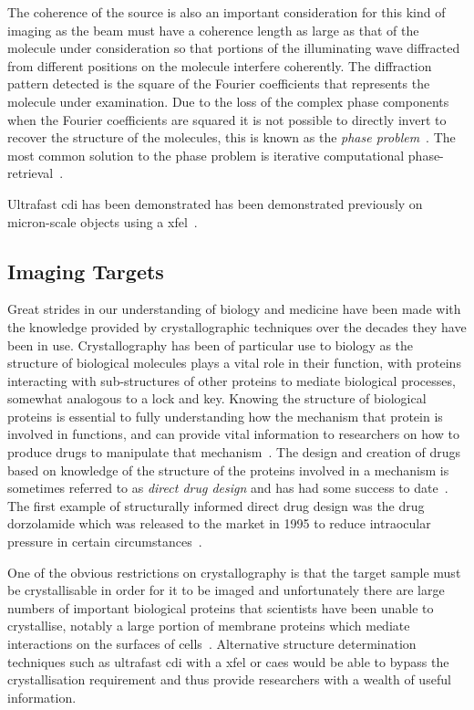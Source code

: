 The coherence of the source is also an important consideration for this kind of imaging as the beam must have a coherence length as large as that of the molecule under consideration so that portions of the illuminating wave diffracted from different positions on the molecule interfere coherently.
The diffraction pattern detected is the square of the Fourier coefficients that represents the molecule under examination.
Due to the loss of the complex phase components when the Fourier coefficients are squared it is not possible to directly invert to recover the structure of the molecules, this is known as the \emph{phase problem}~\cite{rodenburg_phase_1989}.
The most common solution to the phase problem is iterative computational phase-retrieval~\cite{chapman_coherent_2010}.

Ultrafast \gls{cdi} has been demonstrated has been demonstrated previously on micron-scale objects using a \gls{xfel}~\cite{chapman_femtosecond_2006}.

\subsection{Imaging Targets}

Great strides in our understanding of biology and medicine have been made with the knowledge provided by crystallographic techniques over the decades they have been in use.
Crystallography has been of particular use to biology as the structure of biological molecules plays a vital role in their function, with proteins interacting with sub-structures of other proteins to mediate biological processes, somewhat analogous to a lock and key.
Knowing the structure of biological proteins is essential to fully understanding how the mechanism that protein is involved in functions, and can provide vital information to researchers on how to produce drugs to manipulate that mechanism~\cite{aloy_structural_2006,almen_mapping_2009}.
The design and creation of drugs based on knowledge of the structure of the proteins involved in a mechanism is sometimes referred to as \emph{direct drug design} and has had some success to date~\cite{klebe_recent_2000,jhoti_structure-based_2007,mauser_recent_2008}.
The first example of structurally informed direct drug design was the drug dorzolamide which was released to the market in 1995 to reduce intraocular pressure in certain circumstances~\cite{greer_application_1994}.

One of the obvious restrictions on crystallography is that the target sample must be crystallisable in order for it to be imaged and unfortunately there are large numbers of important biological proteins that scientists have been unable to crystallise, notably a large portion of membrane proteins which mediate interactions on the surfaces of cells~\cite{geerlof_impact_2006}.
Alternative structure determination techniques such as ultrafast \gls{cdi} with a \gls{xfel} or \gls{caes} would be able to bypass the crystallisation requirement and thus provide researchers with a wealth of useful information.

